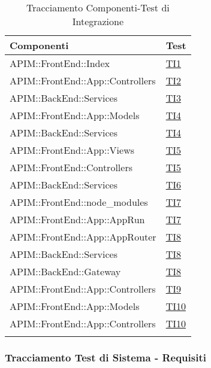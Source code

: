 \normalsize
\begin{longtable}{|>{\centering}m{8cm}|m{5cm}<{\centering}|}
	\hline \rowcolor{Gray}
	\textbf{Componenti} & \textbf{Test}\\
	\hline
	\endhead
	APIM::FrontEnd::Index & \hyperlink{TI1}{TI1} \\ \hline
	APIM::FrontEnd::App::Controllers & \hyperlink{TI2}{TI2} \\ \hline
	APIM::BackEnd::Services & \hyperlink{TI3}{TI3} \\ \hline
	APIM::FrontEnd::App::Models & \hyperlink{TI4}{TI4}\\
	\hline
	APIM::BackEnd::Services & \hyperlink{TI4}{TI4} \\ \hline
	APIM::FrontEnd::App::Views & \hyperlink{TI5}{TI5} \\
	\hline
	APIM::FrontEnd::Controllers & \hyperlink{TI5}{TI5} \\
	\hline
	APIM::BackEnd::Services & \hyperlink{TI6}{TI6} \\ \hline
	APIM::FrontEnd::node\_modules & \hyperlink{TI7}{TI7} \\
	\hline
	APIM::FrontEnd::App::AppRun & \hyperlink{TI7}{TI7} \\
	\hline
	APIM::FrontEnd::App::AppRouter & \hyperlink{TI8}{TI8} \\ \hline
	APIM::BackEnd::Services & \hyperlink{TI8}{TI8} \\
	\hline
	APIM::BackEnd::Gateway & \hyperlink{TI8}{TI8} \\ \hline
	APIM::FrontEnd::App::Controllers & \hyperlink{TI9}{TI9} \\
	\hline
	APIM::FrontEnd::App::Models & \hyperlink{TI10}{TI10} \\
	\hline
	APIM::FrontEnd::App::Controllers & \hyperlink{TI10}{TI10} \\
	\hline
	
	\caption[Tracciamento Componenti-Test di Integrazione]{Tracciamento Componenti-Test di Integrazione}
	\label{tabella:componenti-ti}
\end{longtable}
\clearpage

\subsubsection{Tracciamento Test di Sistema - Requisiti}

